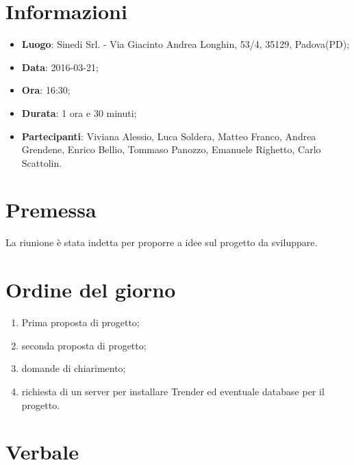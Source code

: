 \documentclass[a4paper,titlepage]{article}
\begin{document}
\maketitle

\newpage
\tableofcontents

\newpage
\section{Informazioni}
\label{sec:Informazioni}

\begin{itemize}
  \item \textbf{Luogo}: Sinedi Srl. - Via Giacinto Andrea Longhin, 53/4, 35129, Padova(PD);
  \item \textbf{Data}: 2016-03-21;
  \item \textbf{Ora}: 16:30;
  \item \textbf{Durata}: 1 ora e 30 minuti;
  \item \textbf{Partecipanti}: Viviana Alessio, Luca Soldera, Matteo Franco, Andrea Grendene, Enrico Bellio, Tommaso Panozzo, Emanuele Righetto, Carlo Scattolin.
\end{itemize}

\newpage
\section{Premessa}

La riunione è stata indetta per proporre a \PROPONENTE{} idee sul progetto da sviluppare.

\section{Ordine del giorno}
\label{sec:OrdineDelGiorno}

\begin{enumerate}
  \item Prima proposta di progetto;
  \item seconda proposta di progetto;
  \item domande di chiarimento;
  \item richiesta di un server per installare Trender ed eventuale database per il progetto.
\end{enumerate}

\newpage
\section{Verbale}
\label{sec:Verbale}
\end{document}
